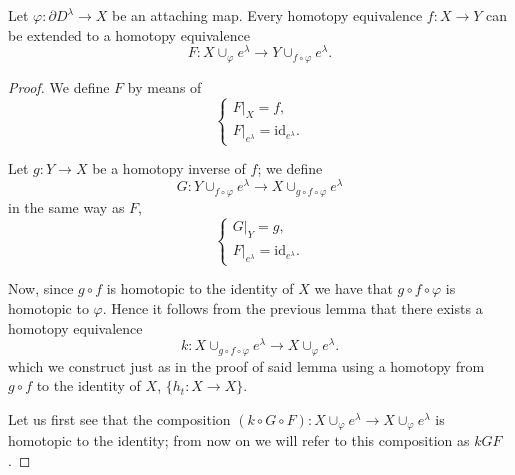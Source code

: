 \begin{lemma}
\label{lema2_democwvariedad}
    Let $\varphi: \partial D^{\lambda} \to X$ be an attaching map. Every homotopy equivalence $f:X\to Y$ can be extended to a homotopy equivalence
    \begin{equation*}
        F: X\cup_{\varphi} e^{\lambda} \to Y\cup_{f\circ\varphi} e^{\lambda}.
    \end{equation*}
\end{lemma}
\begin{proof}
    We define $F$ by means of
    \begin{equation*}
        \begin{cases}
            F|_X = f, \\
            F|_{e^{\lambda}} = \text{id}_{e^{\lambda}}.
        \end{cases}
    \end{equation*}

    Let $g:Y\to X$ be a homotopy inverse of $f$; we define
    \begin{equation*}
        G: Y\cup_{f\circ\varphi} e^{\lambda} \to X\cup_{g\circ f\circ\varphi} e^{\lambda}
    \end{equation*}
    in the same way as $F$,
    \begin{equation*}
        \begin{cases}
            G|_Y = g, \\
            F|_{e^{\lambda}} = \text{id}_{e^{\lambda}}. %
        \end{cases}
    \end{equation*}

    Now, since $g\circ f$ is homotopic to the identity of $X$ we have that $g\circ f\circ\varphi$ is homotopic to $\varphi$. Hence it follows from the previous lemma that there exists a homotopy equivalence
    \begin{equation*}
        k: X\cup_{g\circ f\circ\varphi} e^{\lambda} \to X\cup_{\varphi} e^{\lambda}.
    \end{equation*}
    which we construct just as in the proof of said lemma using a homotopy from $g\circ f$ to the identity of $X$, $\{h_t: X \to X\}$.

    Let us first see that the composition $(k\circ G\circ F):X\cup_{\varphi} e^{\lambda}\to X\cup_{\varphi} e^{\lambda}$ is homotopic to the identity; from now on we will refer to this composition as $kGF$.


\end{proof}
